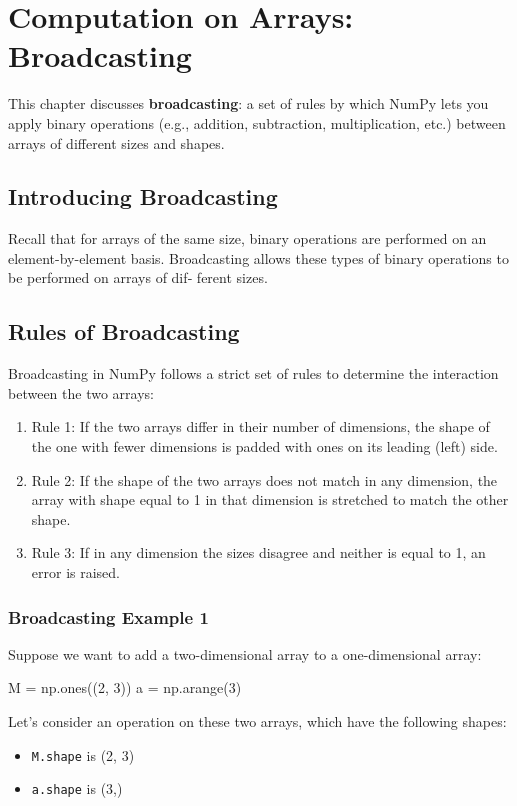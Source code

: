 \chapter{Computation on Arrays: Broadcasting\label{Ch08}}
This chapter discusses \textbf{broadcasting}: a
set of rules by which NumPy lets you apply binary operations (e.g., addition, subtraction, multiplication, etc.) between arrays of different sizes and shapes.
\section{Introducing Broadcasting}
Recall that for arrays of the same size, binary operations are performed on an
element-by-element basis. Broadcasting allows these types of binary operations to be performed on arrays of dif‐
ferent sizes.


\section{Rules of Broadcasting}
Broadcasting in NumPy follows a strict set of rules to determine the interaction
between the two arrays:
\begin{enumerate}
    \item Rule 1: If the two arrays differ in their number of dimensions, the shape of the one with fewer dimensions is padded with ones on its leading (left) side.
    \item Rule 2: If the shape of the two arrays does not match in any dimension, the array with shape equal to 1 in that dimension is stretched to match the other shape.
    \item Rule 3: If in any dimension the sizes disagree and neither is equal to 1, an error is raised.
\end{enumerate}

\subsection{Broadcasting Example 1}
Suppose we want to add a two-dimensional array to a one-dimensional array:
\begin{pyc}
    M = np.ones((2, 3))
    a = np.arange(3)
\end{pyc}

Let's consider an operation on these two arrays, which have the following shapes:
\begin{itemize}
    \item \verb|M.shape| is (2, 3)
    \item \verb|a.shape| is (3,)
\end{itemize}

